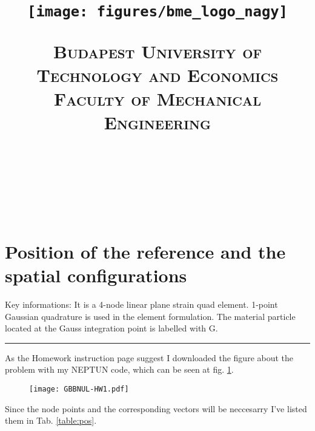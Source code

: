 \documentclass[12pt]{article}
\title{\centering \texttt{[image: figures/bme\_logo\_nagy]}
\bigskip

\normalfont \normalsize \textsc{\centering Budapest University of Technology and Economics
\\ Faculty of Mechanical Engineering} \\ [12pt] \horrule{0.5pt} \\[0.4cm] \huge \HFCIME{} \\ \horrule{2pt} \\[0.5cm]}
\author{\NEV{}}
\newcommand{\horrule}[1]{\rule{\linewidth}{#1}}
\begin{document}

\pagebreak
\maketitle
\pagebreak

\pagebreak
\tableofcontents
\newpage
\section{Position of the reference and the spatial configurations}
Key informations: It is a 4-node linear plane strain quad element. 1-point Gaussian quadrature is used in the element formulation. The material particle located at the Gauss integration point is labelled with G.\\
\horrule{0.4pt}

\noindent As the Homework instruction page suggest I downloaded the figure about the problem with my NEPTUN code, which can be seen at fig. \ref{fig:your-figure-label}. 

  \begin{figure}[ht!]
    \begin{center}
    \texttt{[image: GBBNUL-HW1.pdf]}
    \label{fig:your-figure-label}
    \end{center}
  \end{figure}

\noindent Since the node points and the corresponding vectors will be neccesarry I've listed them in Tab. \ref{table:pos}.
\end{document}
